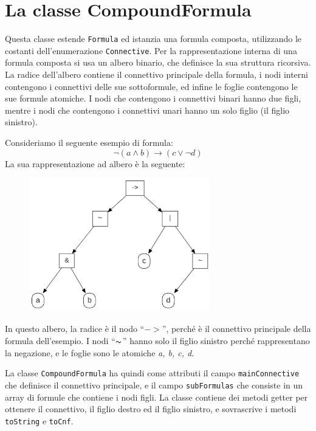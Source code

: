 \documentclass[a4paper,12pt]{report}
\begin{document}
\section{La classe CompoundFormula}
Questa classe estende \texttt{Formula} ed istanzia una formula composta, utilizzando le costanti dell'enumerazione \texttt{Connective}. Per la rappresentazione interna di una formula composta si usa un albero binario, che definisce la sua struttura ricorsiva. La radice dell'albero contiene il connettivo principale della formula, i nodi interni contengono i connettivi delle sue sottoformule, ed infine le foglie contengono le sue formule atomiche. I nodi che contengono i connettivi binari hanno due figli, mentre i nodi che contengono i connettivi unari hanno un solo figlio (il figlio sinistro).

Consideriamo il seguente esempio di formula:
\[\lnot(a \land b) \to (c \lor \lnot d)\]
La sua rappresentazione ad albero è la seguente:
\begin{figure}[H]
    \centering
    \includegraphics[width=0.7\textwidth, height=0.4\textheight]{img/albero.png}
\end{figure}
In questo albero, la radice è il nodo ``$->$'', perché è il connettivo principale della formula dell'esempio. I nodi ``$\thicksim$'' hanno solo il figlio sinistro perché rappresentano la negazione, e le foglie sono le atomiche \emph{a, b, c, d}.

La classe \texttt{CompoundFormula} ha quindi come attributi il campo \texttt{mainConnective} che definisce il connettivo principale, e il campo \texttt{subFormulas} che consiste in un array di formule che contiene i nodi figli. La classe contiene dei metodi getter per ottenere il connettivo, il figlio destro ed il figlio sinistro, e sovrascrive i metodi \texttt{toString} e \texttt{toCnf}.
\end{document}
